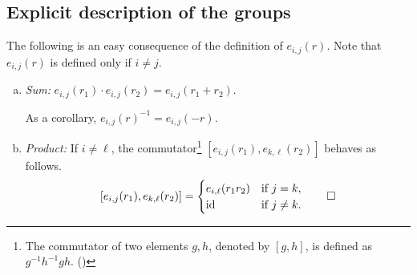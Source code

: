 \documentclass{toc}
\begin{document}
\subsection{Explicit description of the groups}

The following is an easy consequence of the definition of
$e_{i,j}(r)$. Note that $e_{i,j}(r)$ is defined only if $i \neq j$. 

\begin{observation}\label{obs:comm-generators}

  \begin{enumerate}[(a)]
    \item\label{item:comm-gen-sum} \emph{Sum:} $e_{i,j}(r_1) \cdot e_{i,j}(r_2) =
      e_{i,j}(r_1 + r_2)$.

      As a corollary, $e_{i,j}(r)^{-1} = e_{i,j}(-r)$. 
\item\label{item:comm-gen-product} \emph{Product:} If $i \neq \ell$, the commutator\footnote{The commutator of two elements $g,h$,
 denoted by $[g,h]$, %
 is defined as $g^{-1} h^{-1} g h$. ()
}
       $[e_{i,j}(r_1),e_{k,\ell}(r_2)]$ behaves as follows.
  \[
    [e_{i,j}(r_1),e_{k,\ell}(r_2)] = 
    \begin{cases}
      e_{i,\ell}(r_1r_2) & \text{if $j = k$},\\
      \mathrm{id} & \text{if $j \neq k$}.
    \end{cases}\qedhere
  \]
  \end{enumerate}
\end{observation}
\end{document}
